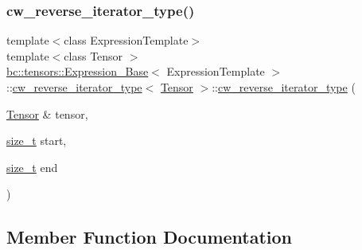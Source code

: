 \subsubsection{\texorpdfstring{cw\+\_\+reverse\+\_\+iterator\+\_\+type()}{cw\_reverse\_iterator\_type()}\hspace{0.1cm}{\footnotesize\ttfamily [3/3]}}
{\footnotesize\ttfamily template$<$class Expression\+Template$>$ \\
template$<$class Tensor $>$ \\
\hyperlink{classbc_1_1tensors_1_1Expression__Base}{bc\+::tensors\+::\+Expression\+\_\+\+Base}$<$ Expression\+Template $>$\+::\hyperlink{structbc_1_1tensors_1_1Expression__Base_1_1cw__reverse__iterator__type}{cw\+\_\+reverse\+\_\+iterator\+\_\+type}$<$ \hyperlink{namespacebc_a659391e47ab612be3ba6c18cf9c89159}{Tensor} $>$\+::\hyperlink{structbc_1_1tensors_1_1Expression__Base_1_1cw__reverse__iterator__type}{cw\+\_\+reverse\+\_\+iterator\+\_\+type} (\begin{DoxyParamCaption}\item[{\hyperlink{namespacebc_a659391e47ab612be3ba6c18cf9c89159}{Tensor} \&}]{tensor,  }\item[{\hyperlink{structbc_1_1tensors_1_1Expression__Base_1_1cw__reverse__iterator__type_a0d2537ccece5626aeb1feef58980f3b6}{size\+\_\+t}}]{start,  }\item[{\hyperlink{structbc_1_1tensors_1_1Expression__Base_1_1cw__reverse__iterator__type_a0d2537ccece5626aeb1feef58980f3b6}{size\+\_\+t}}]{end }\end{DoxyParamCaption})\hspace{0.3cm}{\ttfamily [inline]}}



\subsection{Member Function Documentation}
\mbox{\label{structbc_1_1tensors_1_1Expression__Base_1_1cw__reverse__iterator__type_a71888e4e6761b480dd6e69a95914bd5e}} 
